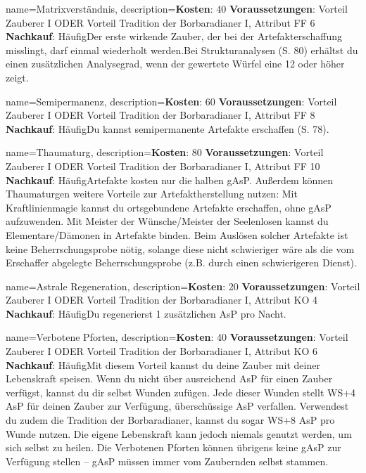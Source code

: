 {
    name={Matrixverständnis},
    description={\textbf{Kosten}: 40 \textbf{Voraussetzungen}: Vorteil Zauberer I ODER Vorteil Tradition der Borbaradianer I, Attribut FF 6 \textbf{Nachkauf}: Häufig\newline Der erste wirkende Zauber, der bei der Artefakterschaffung misslingt, darf einmal wiederholt werden.\newline Bei Strukturanalysen (S. 80) erhältst du einen zusätzlichen Analysegrad, wenn der gewertete Würfel eine 12 oder höher zeigt.}
}


{
    name={Semipermanenz},
    description={\textbf{Kosten}: 60 \textbf{Voraussetzungen}: Vorteil Zauberer I ODER Vorteil Tradition der Borbaradianer I, Attribut FF 8 \textbf{Nachkauf}: Häufig\newline Du kannst semipermanente Artefakte erschaffen (S. 78).}
}


{
    name={Thaumaturg},
    description={\textbf{Kosten}: 80 \textbf{Voraussetzungen}: Vorteil Zauberer I ODER Vorteil Tradition der Borbaradianer I, Attribut FF 10 \textbf{Nachkauf}: Häufig\newline Artefakte kosten nur die halben gAsP. Außerdem können Thaumaturgen weitere Vorteile zur Artefaktherstellung nutzen: Mit Kraftlinienmagie kannst du ortsgebundene Artefakte erschaffen, ohne gAsP aufzuwenden. Mit Meister der Wünsche/Meister der Seelenlosen kannst du Elementare/Dämonen in Artefakte binden. Beim Auslösen solcher Artefakte ist keine Beherrschungsprobe nötig, solange diese nicht schwieriger wäre als die vom Erschaffer abgelegte Beherrschungsprobe (z.B. durch einen schwierigeren Dienst). }
}


{
    name={Astrale Regeneration},
    description={\textbf{Kosten}: 20 \textbf{Voraussetzungen}: Vorteil Zauberer I ODER Vorteil Tradition der Borbaradianer I, Attribut KO 4 \textbf{Nachkauf}: Häufig\newline Du regenerierst 1 zusätzlichen AsP pro Nacht.}
}


{
    name={Verbotene Pforten},
    description={\textbf{Kosten}: 40 \textbf{Voraussetzungen}: Vorteil Zauberer I ODER Vorteil Tradition der Borbaradianer I, Attribut KO 6 \textbf{Nachkauf}: Häufig\newline Mit diesem Vorteil kannst du deine Zauber mit deiner Lebenskraft speisen. Wenn du nicht über ausreichend AsP für einen Zauber verfügst, kannst du dir selbst Wunden zufügen. Jede dieser Wunden stellt WS+4 AsP für deinen Zauber zur Verfügung, überschüssige AsP verfallen. Verwendest du zudem die Tradition der Borbaradianer, kannst du sogar WS+8 AsP pro Wunde nutzen. Die eigene Lebenskraft kann jedoch niemals genutzt werden, um sich selbst zu heilen. Die Verbotenen Pforten können übrigens keine gAsP zur Verfügung stellen – gAsP müssen immer vom Zaubernden selbst stammen.}
}


